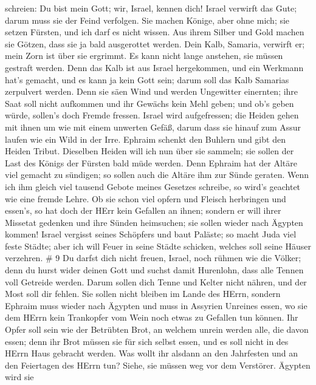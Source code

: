 schreien: Du bist mein Gott; wir, Israel, kennen dich! 
Israel verwirft das Gute; darum muss sie der Feind verfolgen.
 Sie machen Könige, aber ohne mich; sie setzen Fürsten, und
ich darf es nicht wissen. Aus ihrem Silber und Gold machen sie Götzen,
dass sie ja bald ausgerottet werden.  Dein Kalb, Samaria,
verwirft er; mein Zorn ist über sie ergrimmt. Es kann nicht lange
anstehen, sie müssen gestraft werden.  Denn das Kalb ist aus
Israel hergekommen, und ein Werkmann hat's gemacht, und es kann ja kein
Gott sein; darum soll das Kalb Samarias zerpulvert werden. 
Denn sie säen Wind und werden Ungewitter einernten; ihre Saat soll nicht
aufkommen und ihr Gewächs kein Mehl geben; und ob's geben würde,
sollen's doch Fremde fressen.  Israel wird aufgefressen; die
Heiden gehen mit ihnen um wie mit einem unwerten Gefäß, 
darum dass sie hinauf zum Assur laufen wie ein Wild in der Irre. Ephraim
schenkt den Buhlern und gibt den Heiden Tribut.  Dieselben
Heiden will ich nun über sie sammeln; sie sollen der Last des Königs der
Fürsten bald müde werden.  Denn Ephraim hat der Altäre viel
gemacht zu sündigen; so sollen auch die Altäre ihm zur Sünde geraten.
 Wenn ich ihm gleich viel tausend Gebote meines Gesetzes
schreibe, so wird's geachtet wie eine fremde Lehre.  Ob sie
schon viel opfern und Fleisch herbringen und essen's, so hat doch der
HErr kein Gefallen an ihnen; sondern er will ihrer Missetat gedenken und
ihre Sünden heimsuchen; sie sollen wieder nach Ägypten kommen!
 Israel vergisst seines Schöpfers und baut Paläste; so
macht Juda viel feste Städte; aber ich will Feuer in seine Städte
schicken, welches soll seine Häuser verzehren. \# 9  Du
darfst dich nicht freuen, Israel, noch rühmen wie die Völker; denn du
hurst wider deinen Gott und suchst damit Hurenlohn, dass alle Tennen
voll Getreide werden.  Darum sollen dich Tenne und Kelter
nicht nähren, und der Most soll dir fehlen.  Sie sollen
nicht bleiben im Lande des HErrn, sondern Ephraim muss wieder nach
Ägypten und muss in Assyrien Unreines essen,  wo sie dem
HErrn kein Trankopfer vom Wein noch etwas zu Gefallen tun können. Ihr
Opfer soll sein wie der Betrübten Brot, an welchem unrein werden alle,
die davon essen; denn ihr Brot müssen sie für sich selbst essen, und es
soll nicht in des HErrn Haus gebracht werden.  Was wollt ihr
alsdann an den Jahrfesten und an den Feiertagen des HErrn tun?
 Siehe, sie müssen weg vor dem Verstörer. Ägypten wird sie
